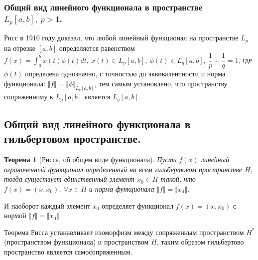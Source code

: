 \documentclass[14pt,a4paper]{extarticle}
\newtheorem{theorem}{Теорема}[section]
\theoremstyle{definition}
\theoremstyle{remark}
\renewcommand{\[}{\begin{dmath*}[compact]}
\renewcommand{\]}{\end{dmath*}}
\newcommand{\ds}{\displaystyle}
\newcommand{\sep}{ , \ \allowbreak }
\newcommand\f[2]{\dfrac{#1}{#2}}
\begin{document}
\subsubsection{Общий вид линейного функционала в пространстве
$L_p[a,b] \sep p > 1$.}

Рисс в 1910 году доказал, что любой линейный функционал на
пространстве $L_p$ на отрезке $[a,b]$ определяется равенством
$\ds f(x) = \int_a^b x(t) \phi(t) dt \sep x(t) \in L_p[a,b] \sep
\phi(t) \in L_q[a,b] \sep \f{1}p+\f{1}q=1$, где $\phi(t)$ определена однозначно,
с точностью до эквивалентности и норма функционала:
$\Vert f \Vert = \Vert \phi \Vert_{L_q[a,b]}$,
тем самым установлено, что пространству сопряженному к $L_p[a,b]$
является $L_q[a,b]$.

\subsection{Общий вид линейного функционала в гильбертовом пространстве.}

\begin{theorem}[Рисса, об общем виде функционала]
  Пусть $f(x)$ линейный ограниченный функционал определенный на всем
  гильбертовом пространстве $H$, тогда существует единственный элемент
  $x_0 \in H$ такой, что $f(x)=(x,x_0) \sep \forall x \in H$
  и норма функционала $\Vert f \Vert = \Vert x_0 \Vert$.
\end{theorem}

И наоборот каждый элемент $x_0$ определяет функционал $f(x)=(x,x_0)$ с нормой
$\Vert f \Vert = \Vert x_0 \Vert$.

Теорема Рисса устанавливает изоморфизм между сопряженным пространством $H^*$
(пространством функционала) и пространством $H$,
таким образом гильбертово пространство является самосопряженным.

\end{document}
